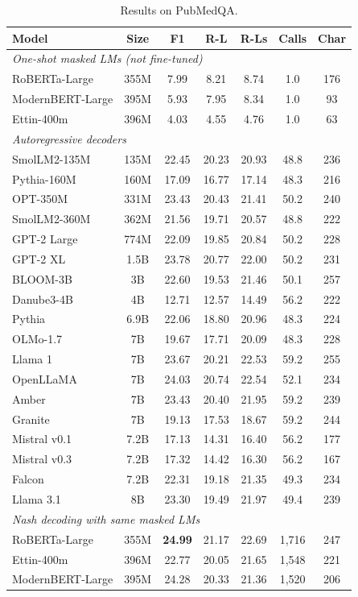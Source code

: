 \begin{table}[t]
\centering
\begin{tabular}{lcccccc}
\toprule
\textbf{Model} & \textbf{Size} & \textbf{F1} & \textbf{R-L} & \textbf{R-Ls} & \textbf{Calls} & \textbf{Char} \\
\midrule
\multicolumn{7}{l}{\textit{One-shot masked LMs (not fine-tuned)}} \\
RoBERTa-Large & 355M & 7.99 & 8.21 & 8.74 & 1.0 & 176 \\
ModernBERT-Large & 395M & 5.93 & 7.95 & 8.34 & 1.0 & 93 \\
Ettin-400m & 396M & 4.03 & 4.55 & 4.76 & 1.0 & 63 \\
\midrule
\multicolumn{7}{l}{\textit{Autoregressive decoders}} \\
SmolLM2-135M & 135M & 22.45 & 20.23 & 20.93 & 48.8 & 236 \\
Pythia-160M & 160M & 17.09 & 16.77 & 17.14 & 48.3 & 216 \\
OPT-350M & 331M & 23.43 & 20.43 & 21.41 & 50.2 & 240 \\
SmolLM2-360M & 362M & 21.56 & 19.71 & 20.57 & 48.8 & 222 \\
GPT-2 Large & 774M & 22.09 & 19.85 & 20.84 & 50.2 & 228 \\
GPT-2 XL & 1.5B & 23.78 & 20.77 & 22.00 & 50.2 & 231 \\
BLOOM-3B & 3B & 22.60 & 19.53 & 21.46 & 50.1 & 257 \\
Danube3-4B & 4B & 12.71 & 12.57 & 14.49 & 56.2 & 222 \\
Pythia & 6.9B & 22.06 & 18.80 & 20.96 & 48.3 & 224 \\
OLMo-1.7 & 7B & 19.67 & 17.71 & 20.09 & 48.3 & 228 \\
Llama 1 & 7B & 23.67 & 20.21 & 22.53 & 59.2 & 255 \\
OpenLLaMA & 7B & 24.03 & 20.74 & 22.54 & 52.1 & 234 \\
Amber & 7B & 23.43 & 20.40 & 21.95 & 59.2 & 239 \\
Granite & 7B & 19.13 & 17.53 & 18.67 & 59.2 & 244 \\
Mistral v0.1 & 7.2B & 17.13 & 14.31 & 16.40 & 56.2 & 177 \\
Mistral v0.3 & 7.2B & 17.32 & 14.42 & 16.30 & 56.2 & 167 \\
Falcon & 7.2B & 22.31 & 19.18 & 21.35 & 49.3 & 234 \\
Llama 3.1 & 8B & 23.30 & 19.49 & 21.97 & 49.4 & 239 \\
\midrule
\multicolumn{7}{l}{\textit{Nash decoding with same masked LMs}} \\
RoBERTa-Large & 355M & \textbf{24.99} & 21.17 & 22.69 & 1,716 & 247 \\
Ettin-400m & 396M & 22.77 & 20.05 & 21.65 & 1,548 & 221 \\
ModernBERT-Large & 395M & 24.28 & 20.33 & 21.36 & 1,520 & 206 \\
\bottomrule
\end{tabular}
\caption{Results on PubMedQA.}
\label{tab:pubmedqa}
\end{table}

